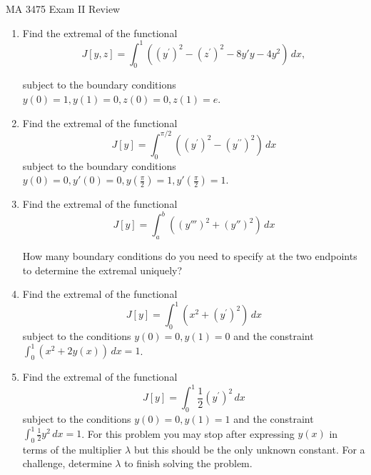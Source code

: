 \documentclass[12pt]{article}
\begin{document}
\noindent MA 3475\,\,Exam II Review 


\begin{enumerate}
\item Find the extremal of the functional
$$
J[y,z] = \int_0^1 \left((y^{\prime})^2 - (z^{\prime})^2 - 8y'y -4 y^2 \right)\,dx,
$$

subject to the boundary conditions $y(0) = 1, y(1)=  0, z(0) = 0, z(1) = e$.


\item Find the extremal of the functional
$$
J[y] = \int_0^{\pi/2} \left((y^{\prime})^2 - (y^{\prime\prime})^2 \right) \,dx
$$
subject to the boundary conditions $y(0) = 0, y'(0) = 0, y\left(\frac{\pi}{2}\right) = 1, y'\left(\frac{\pi}{2}\right) = 1$.


\item Find the extremal of the functional
$$
J[y] = \int_a ^b \left((y''')^2  + (y'')^2  \right)\,dx
$$

How many boundary conditions do you need to specify at the two endpoints to determine the extremal uniquely?

\item Find the extremal of the functional
$$
J[y] = \int_0^1 \left( x^2 + (y^{\prime})^2 \right) \,dx
$$
subject to the conditions $y(0) = 0, y(1) = 0$ and the constraint $\int_0^1 \left( x^2 + 2 y(x) \right)\,dx = 1$.


\item Find the extremal of the functional
$$
J[y] = \int_0^1 \frac{1}{2} (y^{\prime})^2 \,dx
$$
subject to the conditions $y(0) = 0, y(1) = 1$ and the constraint $\int_0^1 \frac{1}{2}y^2 \,dx = 1$. For this problem   you may stop after expressing $y(x)$ in terms of the multiplier $\lambda$ but this should be the only unknown constant. For a challenge, determine $\lambda$ to finish solving the problem.

\end{enumerate}
\end{document}
